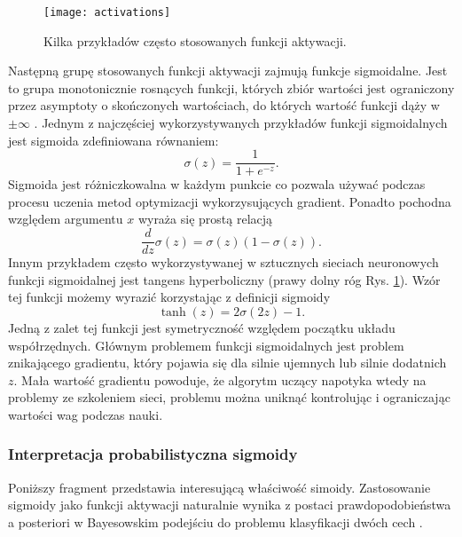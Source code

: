 \documentclass[11pt]{book}
\theoremstyle{definition}
\begin{document}
%
\begin{figure}[h!]
	\centering
	\texttt{[image: activations]}
	\caption{Kilka przykładów często stosowanych funkcji aktywacji.}
	\label{fig:activations}
\end{figure}
%
Następną grupę stosowanych funkcji aktywacji zajmują funkcje sigmoidalne. Jest to grupa monotonicznie rosnących funkcji, których zbiór wartości jest ograniczony przez asymptoty o skończonych wartościach, do których wartość funkcji dąży w $\pm \infty$ \cite{LeCun:1998:EB:645754.668382}. Jednym z najczęściej wykorzystywanych przykładów funkcji sigmoidalnych jest sigmoida zdefiniowana równaniem:
%
\begin{equation}
\sigma(z) = \frac{1}{1+e^{-z}}.
\end{equation}
%
Sigmoida jest różniczkowalna w każdym punkcie co pozwala używać podczas procesu uczenia metod optymizacji wykorzysujących gradient. Ponadto pochodna względem argumentu $x$ wyraża się prostą relacją
%
\begin{equation}
\frac{d}{dz} \sigma(z)= \sigma(z)\left(1 - \sigma(z)\right).
\end{equation}
%
Innym przykładem często wykorzystywanej w sztucznych sieciach neuronowych funkcji sigmoidalnej jest tangens hyperboliczny (prawy dolny róg Rys. \ref{fig:activations}). Wzór tej funkcji możemy wyrazić korzystając z definicji sigmoidy
\begin{equation}
\tanh(z) = 2\sigma(2z)-1.
\end{equation}
%
Jedną z zalet tej funkcji jest symetryczność względem początku układu współrzędnych. Głównym problemem funkcji sigmoidalnych jest problem znikającego gradientu, który pojawia się dla silnie ujemnych lub silnie dodatnich $z$. Mała wartość gradientu powoduje, że algorytm uczący napotyka wtedy na problemy ze szkoleniem sieci, problemu można uniknąć kontrolując i ograniczając wartości wag podczas nauki.

%
\subsubsection{Interpretacja probabilistyczna sigmoidy}
%
Poniższy fragment przedstawia interesującą właściwość simoidy. Zastosowanie sigmoidy jako funkcji aktywacji naturalnie wynika z postaci prawdopodobieństwa a posteriori w Bayesowskim podejściu do problemu klasyfikacji dwóch cech \cite{Bishop:2006:PRML}.
\end{document}
